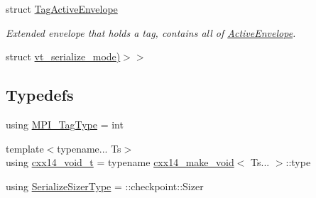 \begin{DoxyCompactItemize}
\item 
struct \hyperlink{structvt_1_1messaging_1_1_tag_active_envelope}{Tag\+Active\+Envelope}
\begin{DoxyCompactList}\small\item\em Extended envelope that holds a tag, contains all of {\ttfamily \hyperlink{structvt_1_1messaging_1_1_active_envelope}{Active\+Envelope}}. \end{DoxyCompactList}\item 
struct \hyperlink{structvt_1_1messaging_1_1msg__serialization__mode_3_01_message_t_00_01cxx14__void__t_3_01decltyp859af933e7cec0c00885df897a55208a}{vt\+\_\+serialize\+\_\+mode)$>$$>$}
\end{DoxyCompactItemize}
\subsection*{Typedefs}
\begin{DoxyCompactItemize}
\item 
using \hyperlink{namespacevt_1_1messaging_af700cb74b7b97c1a305267a9eb3ba91a}{M\+P\+I\+\_\+\+Tag\+Type} = int
\item 
{\footnotesize template$<$typename... Ts$>$ }\\using \hyperlink{namespacevt_1_1messaging_a9724e719b301289eb8b3afbf9c44cf46}{cxx14\+\_\+void\+\_\+t} = typename \hyperlink{structvt_1_1messaging_1_1cxx14__make__void}{cxx14\+\_\+make\+\_\+void}$<$ Ts... $>$\+::type
\item 
using \hyperlink{namespacevt_1_1messaging_ad46de1ccda6ed95e8bb11e85c28be878}{Serialize\+Sizer\+Type} = \+::checkpoint\+::\+Sizer
\end{DoxyCompactItemize}
